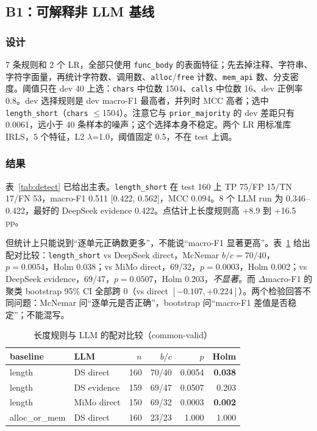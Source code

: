 \documentclass[conference]{IEEEtran}
\newcommand{\best}[1]{\textbf{#1}}
\begin{document}
\subsection{B1：可解释非 LLM 基线}
\label{sec:b1}

\subsubsection{设计}

7 条规则和 2 个 LR，全部只使用 \texttt{func\_body} 的表面特征；先去掉注释、字符串、字符字面量，再统计字符数、调用数、\texttt{alloc}/\texttt{free} 计数、\texttt{mem\_api} 数、分支密度。阈值只在 dev 40 上选：\texttt{chars} 中位数 1504、\texttt{calls} 中位数 16、dev 正例率 0.8。dev 选择规则是 dev macro-F1 最高者，并列时 MCC 高者；选中 \texttt{length\_short}（\texttt{chars} $\le$1504）。注意它与 \texttt{prior\_majority} 的 dev 差距只有 0.0061，远小于 40 条样本的噪声；这个选择本身不稳定。两个 LR 用标准库 IRLS，5 个特征，L2 $\lambda$=1.0，阈值固定 0.5，不在 test 上调。

\subsubsection{结果}

表~\ref{tab:detect} 已给出主表。\texttt{length\_short} 在 test 160 上 TP 75/FP 15/TN 17/FN 53，macro-F1 0.511 [0.422, 0.562]，MCC 0.094。8 个 LLM run 为 0.346--0.422，最好的 DeepSeek evidence 0.422。点估计上长度规则高 +8.9 到 +16.5 pp。

但统计上只能说到“逐单元正确数更多”，不能说“macro-F1 显著更高”。表~\ref{tab:mcnemar} 给出配对比较：\texttt{length\_short} vs DeepSeek direct，McNemar $b/c=70/40$，$p=0.0054$，Holm 0.038；vs MiMo direct，69/32，$p=0.0003$，Holm 0.002；vs DeepSeek evidence，69/47，$p=0.0507$，Holm 0.203，\emph{不显著}。而 $\Delta$macro-F1 的聚类 bootstrap 95\% CI 全部跨 0（vs direct $[-0.107,+0.224]$）。两个检验回答不同问题：McNemar 问“逐单元是否正确”，bootstrap 问“macro-F1 差值是否稳定”；不能混写。

\begin{table}[t]
\centering
\caption{长度规则与 LLM 的配对比较（common-valid）}
\label{tab:mcnemar}
\footnotesize
\setlength{\tabcolsep}{2.6pt}
\begin{tabular}{@{}llrrrr@{}}
\toprule
baseline & LLM & $n$ & $b/c$ & $p$ & Holm \\
\midrule
length & DS direct & 160 & 70/40 & 0.0054 & \best{0.038} \\
length & DS evidence & 159 & 69/47 & 0.0507 & 0.203 \\
length & MiMo direct & 150 & 69/32 & 0.0003 & \best{0.002} \\
alloc\_or\_mem & DS direct & 160 & 23/23 & 1.000 & 1.000 \\
\bottomrule
\end{tabular}
\end{table}
\end{document}

